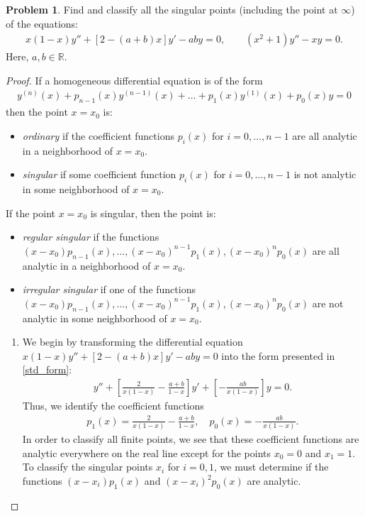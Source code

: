 \documentclass[12pt]{article}
\theoremstyle{definition}
\newtheorem{problem}{Problem}
\begin{document}
\begin{problem}
  Find and classify all the singular points (including the point at $\infty$) of the equations:
  \begin{align*}
    x(1-x)y'' + [2-(a+b)x]y' - aby = 0, \qquad (x^2 + 1)y'' - xy = 0.
  \end{align*}
  Here, $a, b \in \mathbb{R}$.
\end{problem}

\begin{proof}
  If a homogeneous differential equation is of the form
  \begin{align}\label{std_form}
    y^{(n)}(x) + p_{n-1}(x)y^{(n-1)}(x) + \dots + p_1(x)y^{(1)}(x) + p_0(x)y = 0
  \end{align}
  then the point $x = x_0$ is:
  \begin{itemize}
    \item \emph{ordinary} if the coefficient functions $p_i(x)$ for $i=0,\dots,n-1$
      are all analytic in a neighborhood of $x=x_0$.
    \item \emph{singular} if some coefficient function $p_i(x)$ for $i=0,\dots,n-1$
      is not analytic in some neighborhood of $x=x_0$.
  \end{itemize}
  If the point $x=x_0$ is singular, then the point is:
  \begin{itemize}
    \item \emph{regular singular} if the functions $(x-x_0)p_{n-1}(x),\dots,(x-x_0)^{n-1}p_1(x),(x-x_0)^n p_0(x)$ are all analytic in a neighborhood of $x=x_0$.
    \item \emph{irregular singular} if one of the functions $(x-x_0)p_{n-1}(x),\dots,(x-x_0)^{n-1}p_1(x),(x-x_0)^n p_0(x)$ are not analytic in some neighborhood of $x=x_0$.
  \end{itemize}

  \begin{enumerate}
    \item We begin by transforming the differential equation $x(1-x)y'' + [2-(a+b)x]y' - aby = 0$
      into the form presented in \eqref{std_form}:
      \begin{align*}
        y'' + \left[\frac{2}{x(1-x)} - \frac{a+b}{1-x}\right]y' + \left[-\frac{ab}{x(1-x)}\right]y = 0.
      \end{align*}
      Thus, we identify the coefficient functions
      \begin{align*}
        p_1(x) = \frac{2}{x(1-x)} - \frac{a+b}{1-x},\quad p_0(x) = -\frac{ab}{x(1-x)}.
      \end{align*}
      In order to classify all finite points, we see that these coefficient functions are analytic everywhere on the real line except for the points
      $x_0=0$ and $x_1=1$. To classify the singular points $x_i$ for $i=0,1$, we must determine if the functions
      $(x-x_i)p_1(x)$ and $(x-x_i)^2 p_0(x)$ are analytic.


\end{enumerate}
\end{proof}
\end{document}
